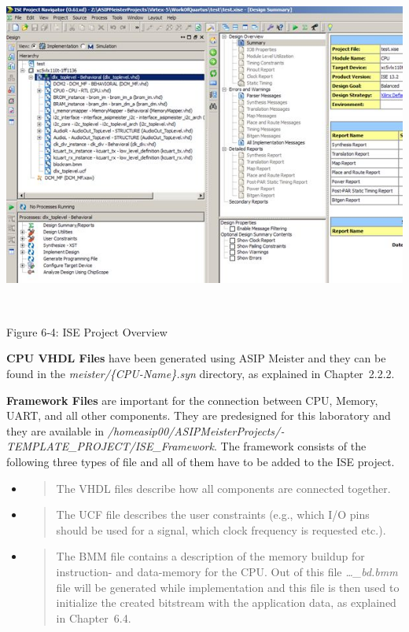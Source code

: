 \documentclass[
]{article}
\begin{document}
\includegraphics[width=6.28333in,height=4.38819in]{6-4.png}

Figure 6‑4:\protect\hypertarget{Fig64}{}{} ISE Project Overview

\textbf{CPU VHDL Files} have been generated using ASIP Meister and they
can be found in the \emph{meister/\{CPU-Name\}.syn} directory, as
explained in Chapter~2.2.2.

\textbf{Framework Files} are important for the connection between CPU,
Memory, UART, and all other components. They are predesigned for this
laboratory and they are available in
\emph{/homeasip00/­ASIPMeisterProjects/­TEMPLATE\_PROJECT/­ISE\_Framework}.
The framework consists of the following three types of file and all of
them have to be added to the ISE project.

\begin{itemize}
\item
  \begin{quote}
  The VHDL files describe how all components are connected together.
  \end{quote}
\item
  \begin{quote}
  The UCF file describes the user constraints (e.g., which I/O pins
  should be used for a signal, which clock frequency is requested etc.).
  \end{quote}
\item
  \begin{quote}
  The BMM file contains a description of the memory buildup for
  instruction- and data-memory for the CPU. Out of this file
  \emph{\ldots\_bd.bmm} file will be generated while implementation and
  this file is then used to initialize the created bitstream with the
  application data, as explained in Chapter~6.4.
  \end{quote}
\end{itemize}
\end{document}
